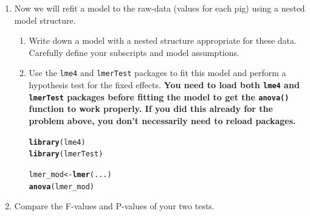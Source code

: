 \documentclass[10pt,twoside]{article}\usepackage[]{graphicx}\usepackage[dvipsnames,svgnames,table]{xcolor}
\makeatletter
\newcommand{\hlsng}[1]{\textcolor[rgb]{0.192,0.494,0.8}{#1}}%
\newcommand{\hlcom}[1]{\textcolor[rgb]{0.678,0.584,0.686}{\textit{#1}}}%
\newcommand{\hldef}[1]{\textcolor[rgb]{0.345,0.345,0.345}{#1}}%
\newcommand{\hlkwb}[1]{\textcolor[rgb]{0.69,0.353,0.396}{#1}}%
\newcommand{\hlkwc}[1]{\textcolor[rgb]{0.333,0.667,0.333}{#1}}%
\newcommand{\hlkwd}[1]{\textcolor[rgb]{0.737,0.353,0.396}{\textbf{#1}}}%
\newenvironment{kframe}{%
 \def\at@end@of@kframe{}%
 \ifinner\ifhmode%
  \def\at@end@of@kframe{\end{minipage}}%
  \begin{minipage}{\columnwidth}%
 \fi\fi%
 \def\FrameCommand##1{\hskip\@totalleftmargin \hskip-\fboxsep
 \colorbox{shadecolor}{##1}\hskip-\fboxsep
     \hskip-\linewidth \hskip-\@totalleftmargin \hskip\columnwidth}%
 \MakeFramed {\advance\hsize-\width
   \@totalleftmargin\z@ \linewidth\hsize
   \@setminipage}}%
 {\par\unskip\endMakeFramed%
 \at@end@of@kframe}
\newenvironment{knitrout}{}{} %
\makeatother
\begin{document}
\begin{enumerate}
\begin{enumerate}
\begin{knitrout}
\color{fgcolor}\begin{kframe}
\begin{alltt}
\hlkwd{library}\hldef{(dplyr)}

\hldef{pig_data} \hlkwb{<-} \hlkwd{read.csv}\hldef{(}\hlsng{'pig_feed_data.csv'}\hldef{)}

\hlcom{# Get mean-weight for each Pen.}
\hldef{mean_pig_data} \hlkwb{<-} \hldef{pig_data |>}
  \hlkwd{group_by}\hldef{(Pen, Feed) |>}
  \hlkwd{summarize}\hldef{(}\hlkwc{Weight} \hldef{=} \hlkwd{mean}\hldef{(Weight))}
\end{alltt}
\end{kframe}
\end{knitrout}

\item Now we will refit a model to the raw-data (values for each pig) using a nested model structure.

\begin{enumerate}
  \item Write down a model with a nested structure appropriate for these data. Carefully define your subscripts and model assumptions.
  
  \item Use the \texttt{lme4} and \texttt{lmerTest} packages to fit this model and perform a hypothesis test for the fixed effects. \textbf{You need to load both \texttt{lme4} and \texttt{lmerTest} packages before fitting the model to get the \texttt{anova()} function to work properly. If you did this already for the problem above, you don't necessarily need to reload packages.}

\begin{knitrout}
\color{fgcolor}\begin{kframe}
\begin{alltt}
\hlkwd{library}\hldef{(lme4)}
\hlkwd{library}\hldef{(lmerTest)}

\hldef{lmer_mod} \hlkwb{<-} \hlkwd{lmer}\hldef{(...)}
\hlkwd{anova}\hldef{(lmer_mod)}
\end{alltt}
\end{kframe}
\end{knitrout}

\end{enumerate}

\item Compare the F-values and P-values of your two tests.


\end{enumerate}
\end{enumerate}
\end{document}
